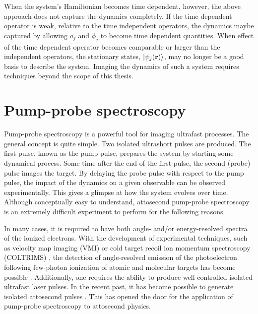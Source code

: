 When the system's Hamiltonian becomes time dependent, however, the above approach does not capture the dynamics completely. If the time dependent operator is weak, relative to the time independent operators, the dynamics maybe captured by allowing $a_j$ and $\phi_j$ to become time dependent quantities. When effect of the time dependent operator becomes comparable or larger than the independent operators, the stationary states, $\ket{\psi_j(\mathbf{r})}$, may no longer be a good basis to describe the system. Imaging the dynamics of such a system requires techniques beyond the scope of this thesis.

\section{Pump-probe spectroscopy} %
\label{sec:pump_probe_spectroscopy}
Pump-probe spectroscopy is a powerful tool for imaging ultrafast processes. The general concept is quite simple. Two isolated ultrashort pulses are produced. The first pulse, known as the pump pulse, prepares the system by starting some dynamical process. Some time after the end of the first pulse, the second (probe) pulse images the target. By delaying the probe pulse with respect to the pump pulse, the impact of the dynamics on a given observable can be observed experimentally. This gives a glimpse at how the system evolves over time. Although conceptually easy to understand, attosecond pump-probe spectroscopy is an extremely difficult experiment to perform for the following reasons. 

In many cases, it is required to have both angle- and/or energy-resolved spectra of the ionized electrons. With the development of experimental techniques, such as velocity map imaging (VMI) \cite{kornilov2010,rouzee2011} or cold target recoil ion momentum spectroscopy (COLTRIMS) \cite{ullrich2003}, the detection of angle-resolved emission of the photoelectron following few-photon ionization of atomic and molecular targets has become possible \cite{ma2013}. 
Additionally, one requires the ability to produce well controlled isolated ultrafast laser pulses. In the recent past, it has become possible to generate isolated attosecond pulses \cite{frank2010}. This has opened the door for the application of pump-probe spectroscopy to attosecond physics. 

